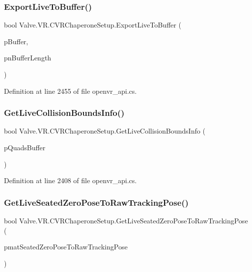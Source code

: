 \subsubsection{\texorpdfstring{ExportLiveToBuffer()}{ExportLiveToBuffer()}}
{\footnotesize\ttfamily bool Valve.\+V\+R.\+C\+V\+R\+Chaperone\+Setup.\+Export\+Live\+To\+Buffer (\begin{DoxyParamCaption}\item[{System.\+Text.\+String\+Builder}]{p\+Buffer,  }\item[{ref uint}]{pn\+Buffer\+Length }\end{DoxyParamCaption})}



Definition at line 2455 of file openvr\+\_\+api.\+cs.

\mbox{\label{class_valve_1_1_v_r_1_1_c_v_r_chaperone_setup_ae4f63ca66c7798282bc9a2ae79c58d1d}} 
\subsubsection{\texorpdfstring{GetLiveCollisionBoundsInfo()}{GetLiveCollisionBoundsInfo()}}
{\footnotesize\ttfamily bool Valve.\+V\+R.\+C\+V\+R\+Chaperone\+Setup.\+Get\+Live\+Collision\+Bounds\+Info (\begin{DoxyParamCaption}\item[{out \mbox{\hyperlink{struct_valve_1_1_v_r_1_1_hmd_quad__t}{Hmd\+Quad\+\_\+t}} \mbox{[}$\,$\mbox{]}}]{p\+Quads\+Buffer }\end{DoxyParamCaption})}



Definition at line 2408 of file openvr\+\_\+api.\+cs.

\mbox{\label{class_valve_1_1_v_r_1_1_c_v_r_chaperone_setup_a3529a7cfb08be0cb85fa55ac70a19d8b}} 
\subsubsection{\texorpdfstring{GetLiveSeatedZeroPoseToRawTrackingPose()}{GetLiveSeatedZeroPoseToRawTrackingPose()}}
{\footnotesize\ttfamily bool Valve.\+V\+R.\+C\+V\+R\+Chaperone\+Setup.\+Get\+Live\+Seated\+Zero\+Pose\+To\+Raw\+Tracking\+Pose (\begin{DoxyParamCaption}\item[{ref \mbox{\hyperlink{struct_valve_1_1_v_r_1_1_hmd_matrix34__t}{Hmd\+Matrix34\+\_\+t}}}]{pmat\+Seated\+Zero\+Pose\+To\+Raw\+Tracking\+Pose }\end{DoxyParamCaption})}



